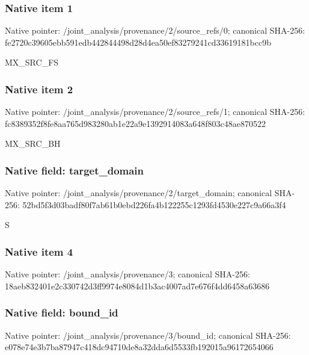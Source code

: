 \documentclass[10pt,a4paper]{article}
\begin{document}
\subsubsection{Native item 1}
Native pointer: /joint\_\allowbreak{}analysis/provenance/2/source\_\allowbreak{}refs/0; canonical SHA-256: fe2720c39605ebb591edb442844498d28d4ea50ef83279241cd33619181bcc9b

\begingroup\raggedright\sloppy MX\_\allowbreak{}SRC\_\allowbreak{}FS\par\endgroup

\subsubsection{Native item 2}
Native pointer: /joint\_\allowbreak{}analysis/provenance/2/source\_\allowbreak{}refs/1; canonical SHA-256: fc8389352f8fe8aa765d983280ab1e22a9e1392914083a648f803c48ae870522

\begingroup\raggedright\sloppy MX\_\allowbreak{}SRC\_\allowbreak{}BH\par\endgroup

\subsubsection{Native field: target\_\allowbreak{}domain}
Native pointer: /joint\_\allowbreak{}analysis/provenance/2/target\_\allowbreak{}domain; canonical SHA-256: 52bd5f3d03badf80f7ab61b0ebd226fa4b122255c1293fd4530e227c9a66a3f4

\begingroup\raggedright\sloppy S\par\endgroup

\subsubsection{Native item 4}
Native pointer: /joint\_\allowbreak{}analysis/provenance/3; canonical SHA-256: 18aeb832401e2c330742d3ff9974e8084d1b3ac4007ad7e676f4dd6458a63686

\subsubsection{Native field: bound\_\allowbreak{}id}
Native pointer: /joint\_\allowbreak{}analysis/provenance/3/bound\_\allowbreak{}id; canonical SHA-256: e078e74e3b7ba87947c418dc94710de8a32dda6d5533fb192015a96172654066
\end{document}
